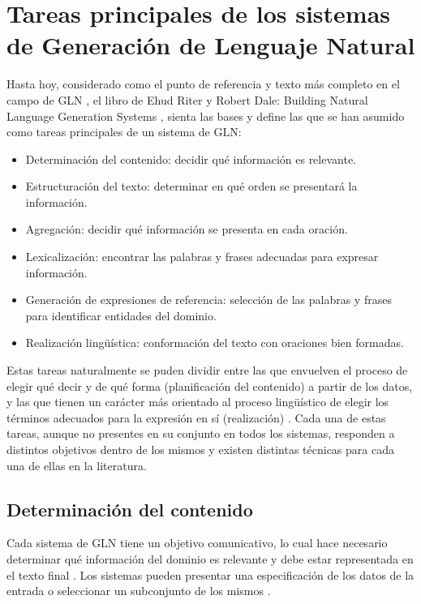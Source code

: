 \section{Tareas principales de los sistemas de Generación de Lenguaje Natural}

    Hasta hoy, considerado como el punto de referencia y texto más completo en el campo de GLN , el libro de Ehud Riter y
Robert Dale: Building Natural Language Generation Systems , sienta las bases y define las que se han asumido como tareas principales 
de un sistema de GLN:

\begin{itemize}
    \item Determinación del contenido: decidir qué información es relevante.
    \item Estructuración del texto: determinar en qué orden se presentará la información.
    \item Agregación: decidir qué información se presenta en cada oración.
    \item Lexicalización: encontrar las palabras y frases adecuadas para expresar información.
    \item Generación de expresiones de referencia: selección de las palabras y frases para identificar entidades del dominio.
    \item Realización lingüística: conformación del texto con oraciones bien formadas.
\end{itemize}


Estas tareas naturalmente se puden dividir entre las que envuelven el proceso de elegir qué decir y de qué forma (planificación del contenido) 
a partir de los datos, y las que tienen un carácter más orientado al proceso lingüístico de elegir los términos adecuados para la expresión 
en sí (realización) . Cada una de estas tareas, aunque no presentes en su conjunto en todos los sistemas, responden a distintos 
objetivos dentro de los mismos y existen distintas técnicas para cada una de ellas en la literatura.
    
\subsection{Determinación del contenido}\label{subsection:selecciondelcontenido}

    Cada sistema de GLN tiene un objetivo comunicativo, lo cual hace necesario determinar qué información del dominio es relevante y debe 
estar representada en el texto final . Los sistemas pueden presentar una especificación de los datos de la entrada 
o seleccionar un subconjunto de los mismos .

